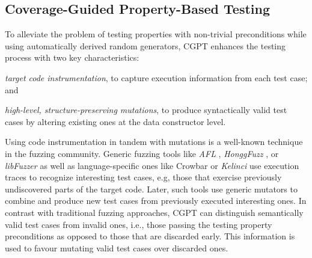\documentclass[sigconf, anonymous, review]{acmart}
\newcommand{\fuzzchick}{\textit{FuzzChick}\xspace}
\begin{document}


\subsection{Coverage-Guided Property-Based Testing}

To alleviate the problem of testing properties with non-trivial preconditions
while using automatically derived random generators, CGPT
%
%
enhances the testing process with two key characteristics:
%
\begin{inparaenum}
\item \emph{target code instrumentation}, to capture execution information from
  each test case; and
\item \emph{high-level, structure-preserving mutations}, to produce
  syntactically valid test cases by altering existing ones at the data
  constructor level.
\end{inparaenum}

Using code instrumentation in tandem with mutations is a well-known technique in
the fuzzing community.
%
Generic fuzzing tools like \emph{AFL} \cite{afl}, \emph{HonggFuzz}
\cite{honggfuzz}, or \emph{libFuzzer} \citeyearpar{libfuzzer} as well as
language-specific ones like Crowbar \cite{dolan2017testing} or \emph{Kelinci}
\cite{kersten2017poster} use execution traces to recognize interesting test
cases, e.g, those that exercise previously undiscovered parts of the target
code.
%
Later, such tools use generic mutators to combine and produce new test cases
from previously executed interesting ones.
%
%
In contrast with traditional fuzzing approaches, CGPT can distinguish
semantically valid test cases from invalid ones, i.e., those passing the testing
property preconditions as opposed to those that are discarded early.
%
This information is used to favour mutating valid test cases over discarded
ones.
\end{document}
